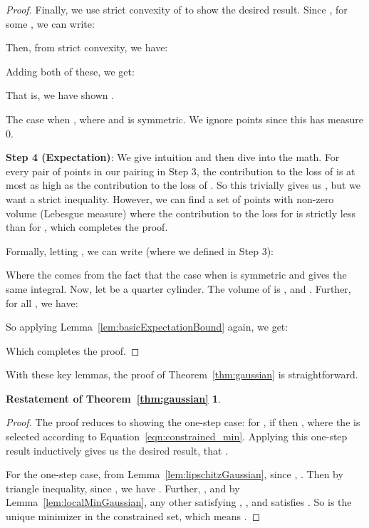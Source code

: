 \documentclass[11pt]{article}
\begin{document}
\begin{proof}
Finally, we use strict convexity of  to show the desired result. Since , for some , we can write:


Then, from strict convexity, we have:


Adding both of these, we get:

That is, we have shown .

The case when , where  and  is symmetric.
We ignore points  since this has measure 0.

\textbf{Step 4 (Expectation)}:
We give intuition and then dive into the math.
For every pair of points in our pairing in Step 3, the contribution to the loss of  is at most as high as the contribution to the loss of .
So this trivially gives us , but we want a strict inequality.
However, we can find a set of points with non-zero volume (Lebesgue measure) where the contribution to the loss for  is strictly less than for , which completes the proof.

Formally, letting , we can write (where we defined  in Step 3):

Where the  comes from the fact that the case when  is symmetric and gives the same integral.
Now, let  be a quarter cylinder.
The volume of  is , and .
Further, for all , we have:

So applying Lemma~\ref{lem:basicExpectationBound} again, we get:

Which completes the proof.
\end{proof}

With these key lemmas, the proof of Theorem~\ref{thm:gaussian} is straightforward.

\newtheorem*{gaussianTheorem}{Restatement of Theorem~\ref{thm:gaussian}}

\begin{gaussianTheorem}
\gaussianTheoremText{}
\end{gaussianTheorem}

\begin{proof}
The proof reduces to showing the one-step case: for , if  then , where the  is selected according to Equation~\eqref{eqn:constrained_min}. Applying this one-step result inductively gives us the desired result, that .

For the one-step case, from Lemma~\ref{lem:lipschitzGaussian}, since , .
Then by triangle inequality, since , we have .
Further, , and by Lemma~\ref{lem:localMinGaussian}, any other  satisfying , , and  satisfies .
So  is the unique minimizer in the constrained set, which means .
\end{proof}
 
\end{document}
